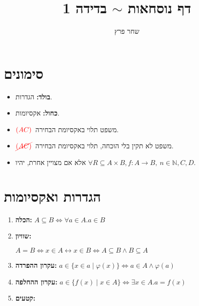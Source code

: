 \documentclass[]{article}
\author{שחר פרץ}
\title{דף נוסחאות $\sim$ בדידה 1}
\newcommand\N     {\mathbb{N}}
\newcommand\ssiff {\leftrightarrow}
\newcommand\vphi  {\varphi}
\newcommand\ax[1]     {\color{blue}#1\color{black}}
\newcommand\ac        {$\color{red}(AC)\color{black}$}
\newcommand\nac       {$\color{red}\cancel{(AC)}\color{black}$}
\begin{document}
	\begin{multicols}{2}
		\section{סימונים}
		\begin{itemize}
			\item \textbf{בולד: }הגדרות. 
			\item \textbf{\ax{כחול: }}אקסיומות. 
			\item \ac \ משפט תלוי באקסיומת הבחירה. 
			\item \nac \ משפט לא תקין בלי הוכחה, תלוי באקסיומת הבחירה. 
			\item אלא אם מצויין אחרת, יהיו $\forall R \subseteq A \times B, f \colon A \to B, \ n \in \N, C, D$. 
		\end{itemize}
		\section{הגדרות ואקסיומות}
		\begin{enumerate}
			\item \textbf{הכלה:  }\hfill$A \subseteq B \iff \forall a \in A. a \in B$
			\item \textbf{שוויון: } 
			
				\hfill$A = B \iff x \in A \ssiff x \in B \iff A \subseteq B \land B \subseteq A$
			\item \ax{\textbf{עקרון ההפרדה: }}\hfill$a \in \{x \in a \mid \vphi(x)\} \iff a \in A \land \vphi(a)$
			\item \ax{\textbf{עקרון ההחלפה: }}\hfill$a \in \{f(x) \mid x \in A\} \iff \exists x \in A. a = f(x)$
			\item \textbf{קטעים: }
			

\end{enumerate}
\end{multicols}
\end{document}
